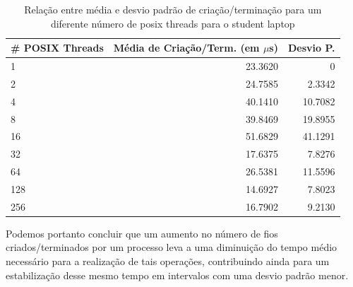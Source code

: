 \documentclass[conference,compsoc]{IEEEtran}
\begin{document}
\begin{table}[H]
\caption{Relação entre média e desvio padrão de criação/terminação para um diferente número de posix threads para o student laptop}
     \label{table:student_create}
\centering
  \begin{tabular}{ | l | r |  r |   }
  
    \hline
    \# POSIX Threads & Média de Criação/Term.  (em $\mu$s) & Desvio P. \\ \hline 
    
1& 23.3620 & 0 \\
2 &  24.7585 & 2.3342 \\
4 & 40.1410 &    10.7082 \\
8 &    39.8469 & 19.8955 \\
16 &    51.6829 &    41.1291 \\
32 &    17.6375  &  7.8276 \\
64 &     26.5381   & 11.5596 \\ 
128 &     14.6927  &     7.8023 \\
256 &     16.7902 &      9.2130 \\
\hline 
  \end{tabular}
\end{table}

Podemos portanto concluir que um aumento no número de fios criados/terminados por um processo leva a uma diminuição do tempo médio necessário para a realização de tais operações, contribuindo ainda para um estabilização desse mesmo tempo em intervalos com uma desvio padrão menor.
\end{document}
